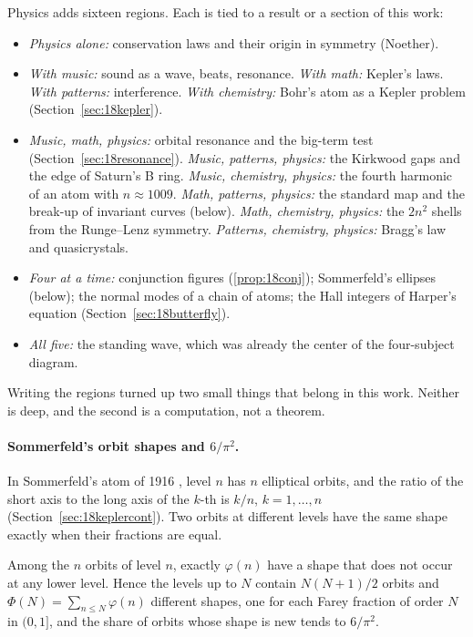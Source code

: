 Physics adds sixteen regions. Each is tied to a result or a section of this work:
\begin{itemize}
\item \emph{Physics alone:} conservation laws and their origin in symmetry (Noether).
\item \emph{With music:} sound as a wave, beats, resonance. \emph{With math:} Kepler's laws. \emph{With patterns:} interference. \emph{With chemistry:} Bohr's atom as a Kepler problem (Section~\ref{sec:18kepler}).
\item \emph{Music, math, physics:} orbital resonance and the big-term test (Section~\ref{sec:18resonance}). \emph{Music, patterns, physics:} the Kirkwood gaps and the edge of Saturn's B ring. \emph{Music, chemistry, physics:} the fourth harmonic of an atom with $n \approx 1009$. \emph{Math, patterns, physics:} the standard map and the break-up of invariant curves (below). \emph{Math, chemistry, physics:} the $2n^2$ shells from the Runge--Lenz symmetry. \emph{Patterns, chemistry, physics:} Bragg's law and quasicrystals.
\item \emph{Four at a time:} conjunction figures (\cref{prop:18conj}); Sommerfeld's ellipses (below); the normal modes of a chain of atoms; the Hall integers of Harper's equation (Section~\ref{sec:18butterfly}).
\item \emph{All five:} the standing wave, which was already the center of the four-subject diagram.
\end{itemize}

Writing the regions turned up two small things that belong in this work. Neither is deep, and the second is a computation, not a theorem.

\paragraph{Sommerfeld's orbit shapes and $6/\pi^2$.} In Sommerfeld's atom of 1916 \citep{sommerfeld1916}, level $n$ has $n$ elliptical orbits, and the ratio of the short axis to the long axis of the $k$-th is $k/n$, $k = 1, \dots, n$ (Section~\ref{sec:18keplercont}). Two orbits at different levels have the same shape exactly when their fractions are equal.

\begin{proposition}\label{prop:sommerfeld}
Among the $n$ orbits of level $n$, exactly $\varphi(n)$ have a shape that does not occur at any lower level. Hence the levels up to $N$ contain $N(N+1)/2$ orbits and $\Phi(N) = \sum_{n \le N}\varphi(n)$ different shapes, one for each Farey fraction of order $N$ in $(0, 1]$, and the share of orbits whose shape is new tends to $6/\pi^2$.
\end{proposition}

